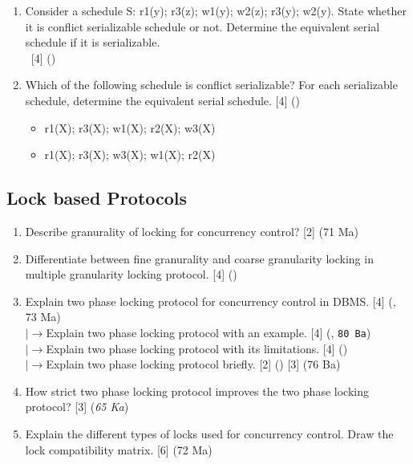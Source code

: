 \documentclass[12pt]{article}
\newcommand{\lb}{\\$\left|\rightarrow\right.$}
\newcommand{\enter}{\\\textcolor{white}{1}}
\begin{document}
\begin{enumerate}[noitemsep, topsep=0pt]
            \item Consider a schedule S: r1(y); r3(z); w1(y); w2(z); r3(y); w2(y). State whether it is conflict serializable schedule or not. Determine the equivalent serial schedule if it is serializable.
            \enter\hfill [4] ()

            \item Which of the following schedule is conflict serializable? For each serializable schedule, determine the equivalent serial schedule. \hfill [4] ()
            \begin{itemize}[noitemsep, topsep=0pt]
                \item r1(X); r3(X); w1(X); r2(X); w3(X)
                \item r1(X); r3(X); w3(X); w1(X); r2(X)
            \end{itemize}
        \end{enumerate}
        
    \subsection{Lock based Protocols}
         \begin{enumerate}[noitemsep, topsep=0pt]
            \item Describe granurality of locking for concurrency control? \hfill [2] (71 Ma)

            \item Differentiate between fine granurality and coarse granularity locking in multiple granularity locking protocol. \hfill [4] ()
            
            \item Explain two phase locking protocol for concurrency control in DBMS. \hfill [4] (, 73 Ma)
            \lb Explain two phase locking protocol with an example. \hfill [4] (, \texttt{80 Ba})
            \lb Explain two phase locking protocol with its limitations. \hfill [4] ()
            \lb Explain two phase locking protocol briefly. \hfill [2] () [3] (76 Ba)

            \item How strict two phase locking protocol improves the two phase locking protocol? \hfill [3] (\textit{65 Ka})

            \item Explain the different types of locks used for concurrency control. Draw the lock compatibility matrix. \hfill [6] (72 Ma)
        \end{enumerate}
\end{document}
